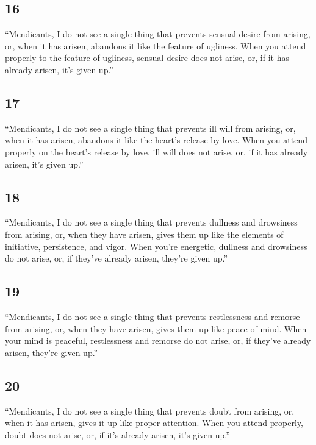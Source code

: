 \documentclass[12pt,openany]{book}%
\begin{document}
\subsection*{16 }

“Mendicants, I do not see a single thing that prevents sensual desire from arising, or, when it has arisen, abandons it like the feature of ugliness. When you attend properly to the feature of ugliness, sensual desire does not arise, or, if it has already arisen, it’s given up.” 

\subsection*{17 }

“Mendicants, I do not see a single thing that prevents ill will from arising, or, when it has arisen, abandons it like the heart’s release by love. When you attend properly on the heart’s release by love, ill will does not arise, or, if it has already arisen, it’s given up.” 

\subsection*{18 }

“Mendicants, I do not see a single thing that prevents dullness and drowsiness from arising, or, when they have arisen, gives them up like the elements of initiative, persistence, and vigor. When you’re energetic, dullness and drowsiness do not arise, or, if they’ve already arisen, they’re given up.” 

\subsection*{19 }

“Mendicants, I do not see a single thing that prevents restlessness and remorse from arising, or, when they have arisen, gives them up like peace of mind. When your mind is peaceful, restlessness and remorse do not arise, or, if they’ve already arisen, they’re given up.” 

\subsection*{20 }

“Mendicants, I do not see a single thing that prevents doubt from arising, or, when it has arisen, gives it up like proper attention. When you attend properly, doubt does not arise, or, if it’s already arisen, it’s given up.” 
\end{document}
